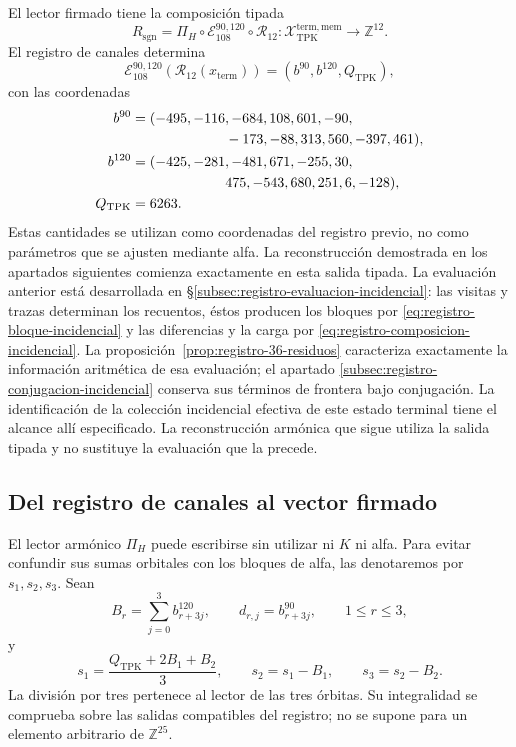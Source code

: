 El lector firmado tiene la composición tipada
\begin{equation}
 R_{\mathrm{sgn}}
 =\Pi_H\circ\mathcal E_{108}^{90,120}\circ\mathcal R_{12}:
 \mathcal X_{\mathrm{TPK}}^{\mathrm{term,mem}}
 \longrightarrow\mathbb Z^{12}.
 \label{eq:k-lector-firmado}
\end{equation}
El registro de canales determina
\[
 \mathcal E_{108}^{90,120}(\mathcal R_{12}(x_{\mathrm{term}}))
 =(b^{90},b^{120},Q_{\mathrm{TPK}}),
\]
con las coordenadas
\begin{align*}
 b^{90}={}&(-495,-116,-684,108,601,-90,\\
            &\hspace{19mm}-173,-88,313,560,-397,461),\\
 b^{120}={}&(-425,-281,-481,671,-255,30,\\
             &\hspace{19mm}475,-543,680,251,6,-128),\\
 Q_{\mathrm{TPK}}={}&6263.
\end{align*}
Estas cantidades se utilizan como coordenadas del registro previo, no
como parámetros que se ajusten mediante alfa. La reconstrucción demostrada
en los apartados siguientes comienza exactamente en esta salida tipada.
La evaluación anterior está desarrollada en
\S\ref{subsec:registro-evaluacion-incidencial}: las visitas y trazas
determinan los recuentos, éstos producen los bloques por
\eqref{eq:registro-bloque-incidencial} y las diferencias y la carga por
\eqref{eq:registro-composicion-incidencial}. La
proposición~\ref{prop:registro-36-residuos} caracteriza exactamente la
información aritmética de esa evaluación; el apartado
\ref{subsec:registro-conjugacion-incidencial} conserva sus términos de
frontera bajo conjugación. La identificación de la colección incidencial
efectiva de este estado terminal tiene el alcance allí especificado.
La reconstrucción armónica que sigue utiliza la salida tipada y no
sustituye la evaluación que la precede.

\subsection{Del registro de canales al vector firmado}
\label{subsec:k-pi-h}

El lector armónico \(\Pi_H\) puede escribirse sin utilizar ni \(K\) ni
alfa. Para evitar confundir sus sumas orbitales con los bloques de alfa,
las denotaremos por \(s_1,s_2,s_3\). Sean
\[
 B_r=\sum_{j=0}^{3}b^{120}_{r+3j},\qquad
 d_{r,j}=b^{90}_{r+3j},\qquad1\leq r\leq3,
\]
y
\begin{equation}
 s_1=\frac{Q_{\mathrm{TPK}}+2B_1+B_2}{3},\qquad
 s_2=s_1-B_1,\qquad s_3=s_2-B_2.
 \label{eq:k-sumas-armonicas}
\end{equation}
La división por tres pertenece al lector de las tres órbitas. Su
integralidad se comprueba sobre las salidas compatibles del registro; no
se supone para un elemento arbitrario de \(\mathbb Z^{25}\).

